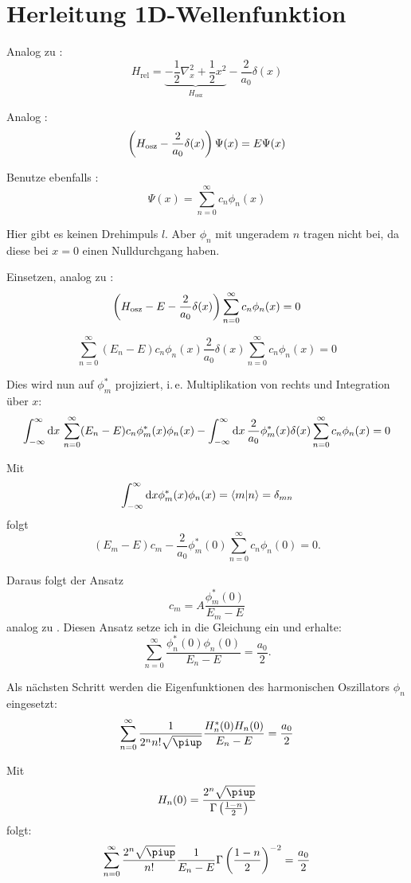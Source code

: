 
\chapter{Herleitung 1D-Wellenfunktion}

\newcommand\br[1]{\parencite[(#1)]{Busch/Two_Cold}}

Analog zu \br2:
\[
    H_\text{rel} =
    \underbrace{- \frac12 \nabla_x^2 + \frac 12 x^2}_{H_\text{osz}} - \frac2{a_0} \delta(x)
\]

Analog \br3:
\[
    \del{H_\text{osz} - \frac2{a_0} \delta(x)} \Psi(x) = E \Psi(x)
\]

Benutze ebenfalls \br4:
\[
    \Psi(x) = \sum_{n=0}^\infty c_n \phi_n(x)
\]

Hier gibt es keinen Drehimpuls $l$. Aber $\phi_n$ mit ungeradem $n$ tragen
nicht bei, da diese bei $x = 0$ einen Nulldurchgang haben.

Einsetzen, analog zu \br5:
\[
    \del{H_\text{osz} - E - \frac2{a_0} \delta(x)}
    \sum_{n=0}^\infty c_n \phi_n(x)
    = 0
\]

\[
    \sum_{n=0}^\infty (E_n - E) c_n \phi_n(x)
    \frac2{a_0} \delta(x)
    \sum_{n=0}^\infty c_n \phi_n(x)
    = 0
\]

Dies wird nun auf $\phi_m^*$ projiziert, i.\,e. Multiplikation von rechts und
Integration über $x$:
\[
    \int_{-\infty}^\infty \dif x \, \sum_{n=0}^\infty
    (E_n - E) c_n \phi_m^*(x) \phi_n(x)
    - 
    \int_{-\infty}^\infty \dif x \,  \frac2{a_0} \phi_m^*(x) \delta(x)
    \sum_{n=0}^\infty c_n \phi_n(x) = 0
\]

Mit
\[
    \int_{-\infty}^\infty \dif x \phi_m^*(x) \phi_n(x) = \braket{m|n} =
    \delta_{mn}
\]
folgt
\[
    (E_m - E) c_m - \frac2{a_0} \phi_m^*(0) \sum_{n=0}^\infty c_n \phi_n(0) =
    0.
\]

Daraus folgt der Ansatz
\[
    c_m = A \frac{\phi_m^*(0)}{E_m - E}
\]
analog zu \br7. Diesen Ansatz setze ich in die Gleichung ein und erhalte:
\[
    \sum_{n=0}^\infty \frac{\phi_n^*(0) \phi_n(0)}{E_n - E} = \frac{a_0}2.
\]

Als nächsten Schritt werden die Eigenfunktionen des harmonischen Oszillators
$\phi_n$ eingesetzt:
\[
    \sum_{n=0}^\infty \frac{1}{2^n n! \sqrt\piup} \frac{H_n^*(0) H_n(0)}{E_n -
    E} = \frac{a_0}2
\]

Mit
\[
    H_n(0) = \frac{2^n \sqrt\piup}{\Gamma\del{\frac{1-n}2}}
\]
folgt:
\[
    \sum_{n=0}^\infty \frac{2^n \sqrt\piup}{n!} \frac{1}{E_n -
    E} \Gamma\del{\frac{1-n}2}^{-2} = \frac{a_0}2
\]

